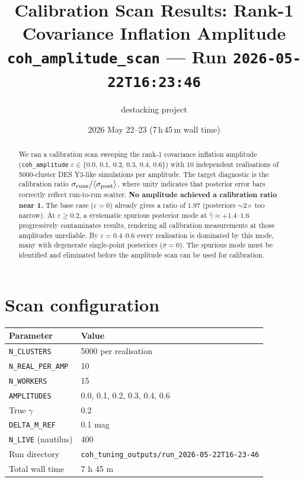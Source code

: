 \documentclass[11pt,a4paper]{article}
\title{\textbf{Calibration Scan Results: Rank-1 Covariance Inflation Amplitude}\\[0.4em]
       \large \texttt{coh\_amplitude\_scan} — Run \texttt{2026-05-22T16:23:46}}
\author{destacking project}
\date{2026 May 22--23 \quad (7\,h\,45\,m wall time)}
\begin{document}
\maketitle

\begin{abstract}
We ran a calibration scan sweeping the rank-1 covariance inflation amplitude
(\texttt{coh\_amplitude} $\varepsilon \in \{0.0,\,0.1,\,0.2,\,0.3,\,0.4,\,0.6\}$)
with 10 independent realisations of 5000-cluster DES Y3-like simulations per amplitude.
The target diagnostic is the calibration ratio
$\sigma_{\rm runs}/\langle\sigma_{\rm post}\rangle$, where unity indicates that
posterior error bars correctly reflect run-to-run scatter.
\textbf{No amplitude achieved a calibration ratio near 1.}
The base case ($\varepsilon=0$) already gives a ratio of $1.97$ (posteriors
$\sim$2$\times$ too narrow).  At $\varepsilon \ge 0.2$, a systematic spurious
posterior mode at $\hat\gamma \approx +1.4$--$1.6$ progressively contaminates
results, rendering all calibration measurements at those amplitudes
unreliable.  By $\varepsilon = 0.4$--$0.6$ every realisation is dominated
by this mode, many with degenerate single-point posteriors ($\sigma=0$).
The spurious mode must be identified and eliminated before the amplitude scan
can be used for calibration.
\end{abstract}

\tableofcontents
\bigskip

\section{Scan configuration}

\begin{tabular}{ll}
\toprule
Parameter & Value \\
\midrule
\texttt{N\_CLUSTERS}      & 5000 per realisation \\
\texttt{N\_REAL\_PER\_AMP} & 10 \\
\texttt{N\_WORKERS}        & 15 \\
\texttt{AMPLITUDES}        & 0.0, 0.1, 0.2, 0.3, 0.4, 0.6 \\
True $\gamma$              & 0.2 \\
\texttt{DELTA\_M\_REF}     & 0.1 mag \\
\texttt{N\_LIVE} (nautilus) & 400 \\
Run directory              & \texttt{coh\_tuning\_outputs/run\_2026-05-22T16-23-46} \\
Total wall time            & 7 h 45 m \\
\bottomrule
\end{tabular}
\end{document}
